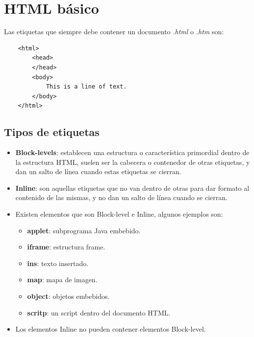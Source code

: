 \section{HTML básico}
\hspace{0.55cm}Las etiquetas que siempre debe contener un documento \textit{.html} o \textit{.htm} son:
\begin{lstlisting}
    <html>
        <head>
        </head>
        <body>
            This is a line of text.
        </body>
    </html>
\end{lstlisting}


\subsection{Tipos de etiquetas}
\begin{itemize}
    \item \textbf{Block-levels}: establecen una estructura o característica primordial dentro de la estructura HTML, suelen ser la cabecera o contenedor de otras etiquetas, y dan un salto de línea cuando estas etiquetas se cierran.
    \item \textbf{Inline}: son aquellas etiquetas que no van dentro de otras para dar formato al contenido de las mismas, y no dan un salto de línea cuando se cierran.
    \item Existen elementos que son Block-level e Inline, algunos ejemplos son:
    \begin{itemize}
        \item \textbf{applet}: subprograma Java embebido.
        \item \textbf{iframe}: estructura frame.
        \item \textbf{ins}: texto insertado.
        \item \textbf{map}: mapa de imagen.
        \item \textbf{object}: objetos embebidos.
        \item \textbf{scritp}: un script dentro del documento HTML.
    \end{itemize}
    \item Los elementos Inline no pueden contener elementos Block-level.
\end{itemize}


